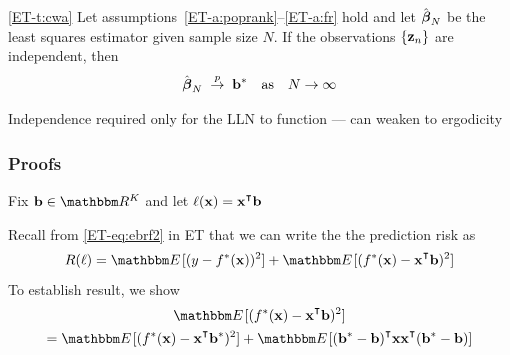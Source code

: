 \begin{frame}

    \vspace{2em}
    \Thm\eqref{ET-t:cwa}
    Let assumptions~\ref{ET-a:poprank}--\ref{ET-a:fr} hold and let $\hat {\boldsymbol \beta}_N$ be
    the least squares estimator given sample size $N$.  If the observations
    $\{{\mathbf z}_n\}$ are independent,  then
    \begin{equation}
        \label{eq:cwa}
        \hat {\boldsymbol \beta}_N \; \stackrel { p } {\to} \; {\mathbf b}^*
          \quad \text{as} \quad
        N \to \infty
    \end{equation}
    
    \vspace{.7em}
    Independence required only for the LLN to function --- can weaken to ergodicity
    
\end{frame}


\begin{frame}\frametitle{Proofs}

    \vspace{2em}
        Fix $\boldb \in \RR^K$ and let 
        $\ell (\boldx) =
        \boldx^\T \boldb$
        
        Recall from
        \eqref{ET-eq:ebrf2} in ET that we can write the
        the prediction risk as
        \begin{equation*}
            R(\ell)
            = \EE[ (y - f^*(\boldx))^2 ] 
            + \EE[ (f^*(\boldx) - \boldx^\T \boldb)^2 ]
        \end{equation*}
        To establish result, we show
        \begin{multline}
            \label{eq:odbb}
            \EE[ (f^*(\boldx) - \boldx^\T \boldb)^2 ]
            \\ = \EE[ (f^*(\boldx) - \boldx^\T \boldb^*)^2 ]
            + \EE[ (\boldb^* - \boldb)^\T 
                \boldx \boldx^\T (\boldb^* - \boldb) ]
        \end{multline}
        
\end{frame}

